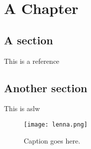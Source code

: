 \chapter{A Chapter}

\lipsum[5]

\section{A section}

This is a reference~\cite{ref1} \lipsum[6-7]

\section{Another section}

This is \ac{aslw} \lipsum[8]

\begin{figure}[htbp]  %
  \centering
  \texttt{[image: lenna.png]}
  \caption{Caption goes here.}
\end{figure}

\lipsum[9-11]
